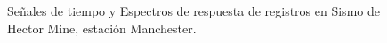 \documentclass[11pt,letterpaper]{article}
\begin{document}
\begin{figure}[H]
\caption{Señales de tiempo y Espectros de respuesta de registros en Sismo de Hector Mine, estación Manchester.}
 \label{fig:semilla}
\end{figure}
\end{document}
